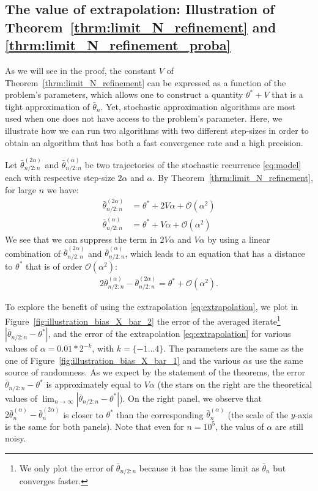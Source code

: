 \documentclass{article}
\newcommand\abs[1]{\left|#1\right|}
\newcommand\bO[1]{\mathcal{O}(#1)}
\begin{document}
\subsection{The value of extrapolation: Illustration of Theorem~\ref{thrm:limit_N_refinement} and \ref{thrm:limit_N_refinement_proba}}

As we will see in the proof, the constant $V$ of Theorem~\ref{thrm:limit_N_refinement} can be expressed as a function of the problem's parameters, which allows one to construct a quantity $\theta^*+V$ that is a tight approximation of $\bar{\theta}_n$.  Yet, stochastic approximation algorithms are most used when one does not have access to the problem's parameter. Here, we illustrate how we can run two algorithms with two different step-sizes in order to obtain an algorithm that has both a fast convergence rate and a high precision. 

Let $\bar{\theta}_{n/2:n}^{(2\alpha)}$ and $\bar{\theta}_{n/2:n}^{(\alpha)}$ be two trajectories of the stochastic recurrence \eqref{eq:model} each with respective step-size $2\alpha$ and $\alpha$. By Theorem~\ref{thrm:limit_N_refinement}, for large $n$ we have: 
\begin{align*}
    \bar{\theta}_{n/2:n}^{(2\alpha)} &= \theta^* + 2V\alpha + \bO{\alpha^2}\\
    \bar{\theta}_{n/2:n}^{(\alpha)} &= \theta^* + V\alpha + \bO{\alpha^2}
\end{align*}
We see that we can suppress the term in $2V\alpha$ and $V\alpha$ by using a linear combination of $\bar{\theta}_{n/2:n}^{(2\alpha)}$ and $\bar{\theta}_{n/2:n}^{(\alpha)}$, which leads to an equation that has a distance to $\theta^*$ that is of order $\bO{\alpha^2}$:
\begin{align}
    \label{eq:extrapolation}
    2\bar{\theta}_{n/2:n}^{(\alpha)} - \bar{\theta}_{n/2:n}^{(2\alpha)} = \theta^* + \bO{\alpha^2}.
\end{align}



To explore the benefit of using the extrapolation \eqref{eq:extrapolation}, we plot in Figure~\ref{fig:illustration_bias_X_bar_2} the error of the averaged iterate\footnote{We only plot the error of $\bar{\theta}_{n/2:n}$ because it has the same limit as $\bar{\theta}_n$ but converges faster.} $\abs{\bar{\theta}_{n/2:n}-\theta^*}$, and the error of the extrapolation \eqref{eq:extrapolation} for various values of $\alpha=0.01*2^{-k}$, with $k=\{-1\dots 4\}$.  The parameters are the same as the one of Figure~\ref{fig:illustration_bias_X_bar_1} and the various $\alpha$s use the same source of randomness.  As we expect by the statement of the theorems, the error $\bar{\theta}_{n/2:n}-\theta^*$ is approximately equal to $V \alpha$ (the stars on the right are the theoretical values of $\lim_{n\to\infty}\abs{\bar{\theta}_{n/2:n}-\theta^*}$).  On the right panel, we observe that $2\bar{\theta}_n^{(\alpha)} - \bar{\theta}_n^{(2\alpha)}$ is closer to $\theta^*$ than the corresponding $\bar{\theta}_n^{(\alpha)}$ (the scale of the $y$-axis is the same for both panels). Note that even for $n=10^5$, the valus of $\alpha$ are still noisy.
\end{document}
